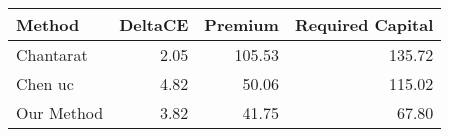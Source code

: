 \begin{tabular}{lrrr}
\toprule
Method & DeltaCE & Premium & Required Capital \\
\midrule
Chantarat & 2.05 & 105.53 & 135.72 \\
Chen uc & 4.82 & 50.06 & 115.02 \\
Our Method & 3.82 & 41.75 & 67.80 \\
\bottomrule
\end{tabular}

